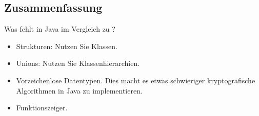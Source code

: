 \subsection{Zusammenfassung}

Was fehlt in Java im Vergleich zu \CCpp?

\begin{itemize}
\item Strukturen: Nutzen Sie Klassen.

\item Unions: Nutzen Sie Klassenhierarchien.

\item Vorzeichenlose Datentypen.
Dies macht es etwas schwieriger kryptografische Algorithmen in Java zu implementieren.

\item Funktionszeiger.
\end{itemize}
